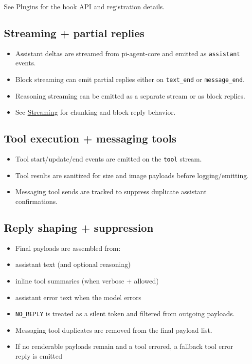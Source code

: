 See \href{/tools/plugin\#plugin-hooks}{Plugins} for the hook API and registration details.

\subsection{Streaming + partial replies}


\begin{itemize}
  \item Assistant deltas are streamed from pi-agent-core and emitted as \texttt{assistant} events.
  \item Block streaming can emit partial replies either on \texttt{text\_end} or \texttt{message\_end}.
  \item Reasoning streaming can be emitted as a separate stream or as block replies.
  \item See \href{/concepts/streaming}{Streaming} for chunking and block reply behavior.
\end{itemize}


\subsection{Tool execution + messaging tools}


\begin{itemize}
  \item Tool start/update/end events are emitted on the \texttt{tool} stream.
  \item Tool results are sanitized for size and image payloads before logging/emitting.
  \item Messaging tool sends are tracked to suppress duplicate assistant confirmations.
\end{itemize}


\subsection{Reply shaping + suppression}


\begin{itemize}
  \item Final payloads are assembled from:
  \item assistant text (and optional reasoning)
  \item inline tool summaries (when verbose + allowed)
  \item assistant error text when the model errors
  \item \texttt{NO\_REPLY} is treated as a silent token and filtered from outgoing payloads.
  \item Messaging tool duplicates are removed from the final payload list.
  \item If no renderable payloads remain and a tool errored, a fallback tool error reply is emitted
\end{itemize}


